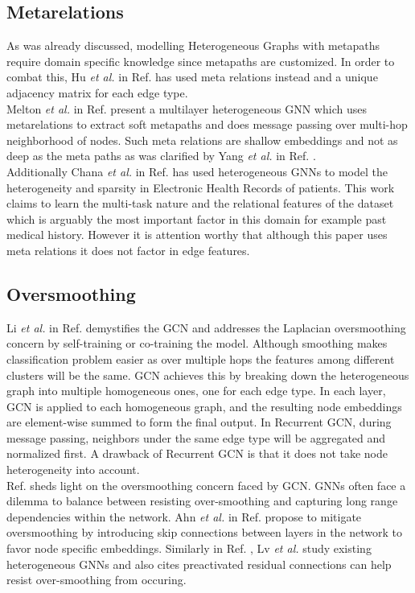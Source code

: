 \documentclass{report} %
\begin{document}
\subsection{Metarelations}\label{subsec:HGNN Metarelations}
As was already discussed, modelling Heterogeneous Graphs with metapaths require domain specific knowledge since metapaths are customized. 
In order to combat this, Hu \textit{et al.} in Ref. \cite{HGT-2022} has used meta relations instead and a unique adjacency matrix for each edge type.\\
Melton \textit{et al.} in Ref. \cite{MHGNN-2023} present a multilayer heterogeneous \ac{GNN} which uses metarelations to extract soft metapaths 
and does message passing over multi-hop neighborhood of nodes.
Such meta relations are shallow embeddings and not as deep as the meta paths as was clarified by Yang \textit{et al.} in Ref. \cite{HGNN-2020}. \\
Additionally Chana \textit{et al.} in Ref. \cite{EHR HGNN-2024} has used heterogeneous \ac{GNN}s to model the heterogeneity and sparsity in Electronic 
Health Records of patients. This work claims to learn the multi-task nature and  the relational features of the dataset which is arguably the most important factor in 
this domain for example past medical history. However it is attention worthy that although this paper uses meta relations it does not factor in edge features.\\

\subsection{Oversmoothing}\label{subsec:HGNN Oversmoothing}
Li \textit{et al.} in Ref. \cite{GCN-2018} demystifies the \ac{GCN} and addresses the Laplacian oversmoothing concern by self-training or co-training the model.
Although smoothing makes classification problem easier as over multiple hops the features among different clusters will be the same.
\ac{GCN} achieves this by breaking down the heterogeneous graph into multiple homogeneous ones, one for each edge type. 
In each layer, \ac{GCN} is applied to each homogeneous graph, and the resulting node embeddings are element-wise summed to form the final output. 
In Recurrent \ac{GCN}, during message passing, neighbors under the same edge type will be aggregated and normalized first. 
A drawback of Recurrent \ac{GCN} is that it does not take node heterogeneity into account. \\
Ref. \cite{GCN-2018} sheds light on the oversmoothing concern faced by \ac{GCN}.
\ac{GNN}s often face a dilemma to balance between resisting over-smoothing and capturing long range dependencies within the network.
Ahn \textit{et al.} in Ref. \cite{RHGNN-2022} propose to mitigate oversmoothing by introducing skip connections between layers in the network to favor node specific embeddings.
Similarly in Ref. \cite{REF HGNN-2021}, Lv \textit{et al.} study existing heterogeneous \ac{GNN}s and also cites preactivated residual connections can help resist 
over-smoothing from occuring.
\end{document}
